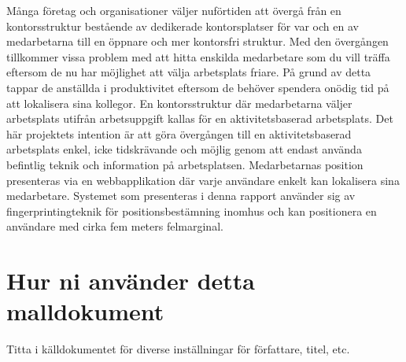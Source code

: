 \documentclass[a4paper,12pt]{article}
\begin{document}
\begin{sammanfattning}
  Många företag och organisationer väljer nuförtiden att övergå från en kontorsstruktur bestående av dedikerade kontorsplatser för var och en av medarbetarna till en öppnare och mer kontorsfri struktur. Med den övergången tillkommer vissa problem med att hitta enskilda medarbetare som du vill träffa eftersom de nu har möjlighet att välja arbetsplats friare. På grund av detta tappar de anställda i produktivitet eftersom de behöver spendera onödig tid på att lokalisera sina kollegor. En kontorsstruktur där medarbetarna väljer arbetsplats utifrån arbetsuppgift kallas för en aktivitetsbaserad arbetsplats. Det här projektets intention är att göra övergången till en aktivitetsbaserad arbetsplats enkel, icke tidskrävande och möjlig genom att endast använda befintlig teknik och information på arbetsplatsen. Medarbetarnas position presenteras via en webbapplikation där varje användare enkelt kan lokalisera sina medarbetare. Systemet som presenteras i denna rapport använder sig av fingerprintingteknik för positionsbestämning inomhus och kan positionera en användare med cirka fem meters felmarginal.

\end{sammanfattning}

\tableofcontents


\cleardoublepage


\mainmatter

\iffalse
\section*{Hur ni använder detta malldokument}
Titta i källdokumentet för diverse inställningar för författare, titel, etc.
\end{document}
